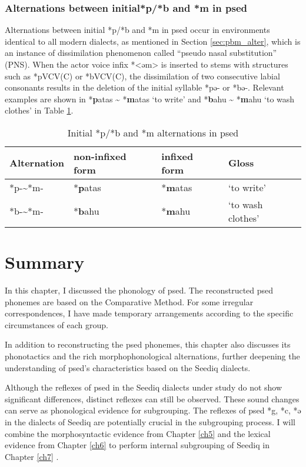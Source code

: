 \subsubsection{Alternations between initial*p/*b and *m in \acl{psed}}

Alternations between initial *p/*b and *m in \acl{psed} occur in environments identical to all modern dialects, as mentioned in Section \ref{sec:pbm_alter}, which is an instance of dissimilation phenomenon called ``pseudo nasal substitution'' (PNS). When the actor voice infix *<əm> is inserted to stems with structures such as *pVCV(C) or *bVCV(C), the dissimilation of two consecutive labial consonants results in the deletion of the initial syllable *pə- or *bə-. Relevant examples are shown in *\textbf{p}atas \~{} *\textbf{m}atas `to write' and *\textbf{b}ahu \~{} *\textbf{m}ahu `to wash clothes' in Table \ref{tab:psed_bp2m}.

\begin{table}[!htbp]
\centering
\caption{Initial *p/*b and *m alternations in \acl{psed}}
\label{tab:psed_bp2m}
\begin{tabular}{llll}
\hline
Alternation  & non-infixed form  & infixed form & Gloss                   \\ \hline
*p-\~{ }*m-  & *\textbf{p}atas & *\textbf{m}atas   & `to write'               \\
*b-\~{ }*m-  & *\textbf{b}ahu  & *\textbf{m}ahu     & `to wash clothes' \\ \hline
\end{tabular}
\end{table}

\section{Summary}

In this chapter, I discussed the phonology of \acl{psed}. The reconstructed \acl{psed} phonemes are based on the Comparative Method. For some irregular correspondences, I have made temporary arrangements according to the specific circumstances of each group.

In addition to reconstructing the \acl{psed} phonemes, this chapter also discusses its phonotactics and the rich morphophonological alternations, further deepening the understanding of \acl{psed}'s characteristics based on the Seediq dialects.

Although the reflexes of \acl{psed} in the Seediq dialects under study do not show significant differences, distinct reflexes can still be observed. These sound changes can serve as phonological evidence for subgrouping. The reflexes of \acl{psed} *g, *c, *ə in the dialects of Seediq are potentially crucial in the subgrouping process. I will combine the morphosyntactic evidence from Chapter \ref{ch5} and the lexical evidence from Chapter \ref{ch6} to perform internal subgrouping of Seediq in Chapter \ref{ch7} .